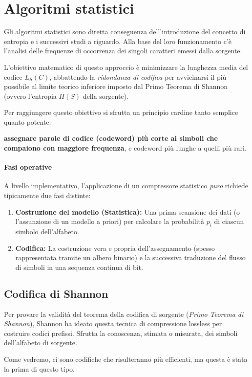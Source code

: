 \section{Algoritmi statistici}
Gli algoritmi statistici sono diretta conseguenza dell'introduzione del concetto di entropia e i successivi studi a riguardo.
Alla base del loro funzionamento c'è l'analisi delle frequenze di occorrenza dei singoli caratteri emessi dalla sorgente.

L'obiettivo matematico di questo approccio è minimizzare la lunghezza media del codice $L_S(C)$, abbattendo la \textit{ridondanza di codifica} per avvicinarsi il più possibile al limite teorico inferiore imposto dal Primo Teorema di Shannon (ovvero l'entropia $H(S)$ della sorgente).

Per raggiungere questo obiettivo si sfrutta un principio cardine tanto semplice quanto potente: 

\textbf{assegnare parole di codice (codeword) più corte ai simboli che compaiono con maggiore frequenza}, e codeword più lunghe a quelli più rari.

\paragraph{Fasi operative}
A livello implementativo, l'applicazione di un compressore statistico \textit{puro} richiede tipicamente due fasi distinte:
\begin{enumerate}
    \item \textbf{Costruzione del modello (Statistica):} Una prima scansione dei dati (o l'assunzione di un modello a priori) per calcolare la probabilità $p_i$ di ciascun simbolo dell'alfabeto.
    \item \textbf{Codifica:} La costruzione vera e propria dell'assegnamento (spesso rappresentata tramite un albero binario) e la successiva traduzione del flusso di simboli in una sequenza continua di bit.
\end{enumerate}

\subsection{Codifica di Shannon}
Per provare la validità del teorema della codifica di sorgente (\textit{Primo Teorema di Shannon}), Shannon ha ideato questa tecnica di compressione lossless per costruire codici prefissi. Sfrutta la conoscenza, stimata o misurata, dei simboli dell'alfabeto di sorgente.

Come vedremo, ci sono codifiche che risulteranno più efficienti, ma questa è stata la prima di questo tipo.

